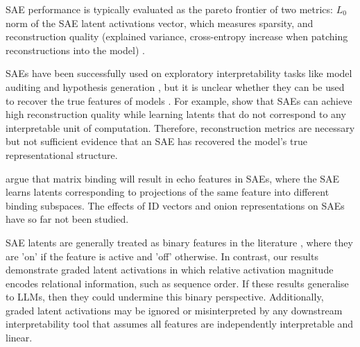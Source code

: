 
SAE performance is typically evaluated as the pareto frontier of two metrics: $L_0$ norm of the SAE latent activations vector, which measures sparsity, and reconstruction quality (explained variance, cross-entropy increase when patching reconstructions into the model) \citep{karvonen2025saebench,ferrando2024primer,bricken2023monosemanticity}.

SAEs have been successfully used on exploratory interpretability tasks like model auditing \citep{marks2025auditing} and hypothesis generation \citep{movva2025sparse}, but it is unclear whether they can be used to recover the true features of models \citep{leask2025sparse, chanin2024absorption}.
For example, \citet{leask2025sparse} show that SAEs can achieve high reconstruction quality while learning latents that do not correspond to any interpretable unit of computation.
Therefore, reconstruction metrics are necessary but not sufficient evidence that an SAE has recovered the model's true representational structure.

\citet{wattenberg2024relational} argue that matrix binding will result in echo features in SAEs, where the SAE learns latents corresponding to projections of the same feature into different binding subspaces. The effects of ID vectors and onion representations on SAEs have so far not been studied. 

SAE latents are generally treated as binary features in the literature \citep{paulo2024automatically, quirke2025binary}, where they are 'on' if the feature is active and 'off' otherwise. In contrast, our results demonstrate graded latent activations in which relative activation magnitude encodes relational information, such as sequence order. If these results generalise to LLMs, then they could undermine this binary perspective. Additionally, graded latent activations may be ignored or misinterpreted by any downstream interpretability tool that assumes all features are independently interpretable and linear.
